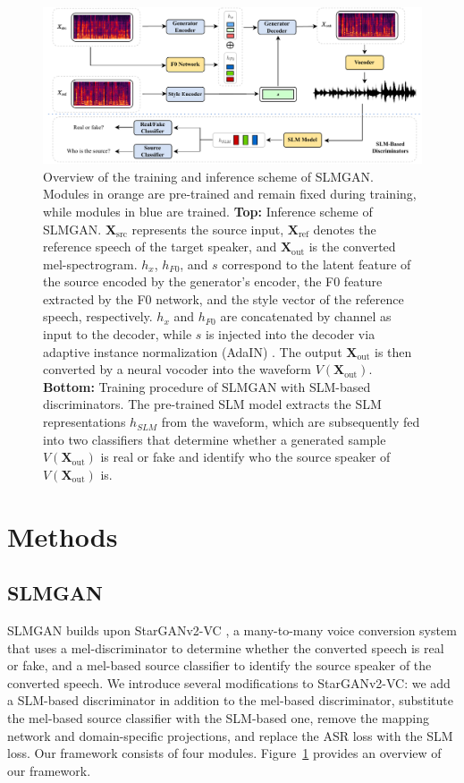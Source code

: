 \documentclass{article}
\begin{document}
\begin{sloppy}
\begin{figure}[t]
  \centering
  \includegraphics[width=\linewidth]{fig1.pdf}
  \caption{Overview of the training and inference scheme of SLMGAN. Modules in orange are pre-trained and remain fixed during training, while modules in blue are trained. \textbf{Top:} Inference scheme of SLMGAN. $\bm{X}_{\text{src}}$ represents the source input, $\bm{X}_{\text{ref}}$ denotes the reference speech of the target speaker, and $\bm{X}_{\text{out}}$ is the converted mel-spectrogram. $h_x$, $h_{F0}$, and $s$ correspond to the latent feature of the source encoded by the generator's encoder, the F0 feature extracted by the F0 network, and the style vector of the reference speech, respectively. $h_x$ and $h_{F0}$ are concatenated by channel as input to the decoder, while $s$ is injected into the decoder via adaptive instance normalization (AdaIN) \cite{huang2017arbitrary}. The output $\bm{X}_{\text{out}}$ is then converted by a neural vocoder into the waveform $V(\bm{X}_{\text{out}})$. \textbf{Bottom:} Training procedure of SLMGAN with SLM-based discriminators. The pre-trained SLM model extracts the SLM representations $h_{SLM}$ from the waveform, which are subsequently fed into two classifiers that determine whether a generated sample $V(\bm{X}_{\text{out}})$ is real or fake and identify who the source speaker of $V(\bm{X}_{\text{out}})$ is. }
  
  \label{fig:slmgan}
\end{figure}

\section{Methods}
\label{sec:methods}
\subsection{SLMGAN} 
SLMGAN builds upon StarGANv2-VC \cite{li2021starganv2}, a many-to-many voice conversion system that uses a mel-discriminator to determine whether the converted speech is real or fake, and a mel-based source classifier to identify the source speaker of the converted speech. We introduce several modifications to StarGANv2-VC: we add a SLM-based discriminator in addition to the mel-based discriminator, substitute the mel-based source classifier with the SLM-based one, remove the mapping network and domain-specific projections, and replace the ASR loss with the SLM loss. Our framework consists of four modules. Figure~\ref{fig:slmgan} provides an overview of our framework.


\end{sloppy}
\end{document}
